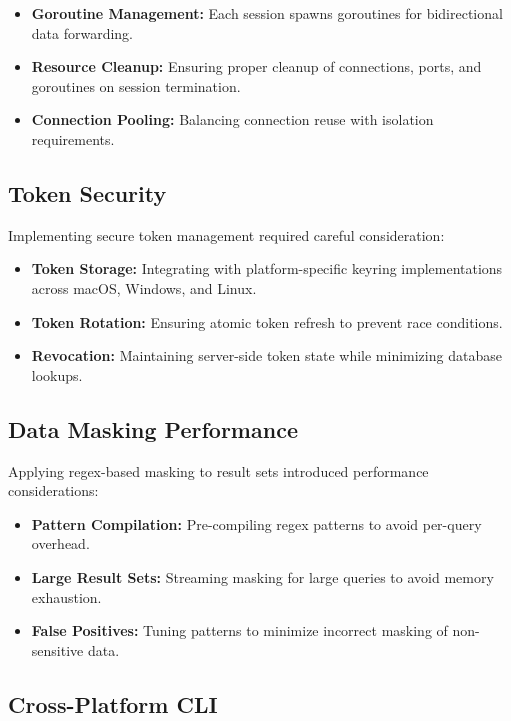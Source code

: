 \begin{itemize}
    \item \textbf{Goroutine Management:} Each session spawns goroutines for bidirectional data forwarding.
    \item \textbf{Resource Cleanup:} Ensuring proper cleanup of connections, ports, and goroutines on session termination.
    \item \textbf{Connection Pooling:} Balancing connection reuse with isolation requirements.
\end{itemize}

\subsection{Token Security}

Implementing secure token management required careful consideration:

\begin{itemize}
    \item \textbf{Token Storage:} Integrating with platform-specific keyring implementations across macOS, Windows, and Linux.
    \item \textbf{Token Rotation:} Ensuring atomic token refresh to prevent race conditions.
    \item \textbf{Revocation:} Maintaining server-side token state while minimizing database lookups.
\end{itemize}

\subsection{Data Masking Performance}

Applying regex-based masking to result sets introduced performance considerations:

\begin{itemize}
    \item \textbf{Pattern Compilation:} Pre-compiling regex patterns to avoid per-query overhead.
    \item \textbf{Large Result Sets:} Streaming masking for large queries to avoid memory exhaustion.
    \item \textbf{False Positives:} Tuning patterns to minimize incorrect masking of non-sensitive data.
\end{itemize}

\subsection{Cross-Platform CLI}

